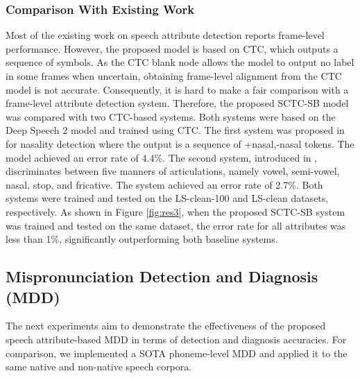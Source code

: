 \documentclass[12pt]{elsarticle}
\begin{document}
\subsubsection{Comparison With Existing Work} \label{sssec:Comp}

Most of the existing work on speech attribute detection reports frame-level performance. However, the proposed model is based on CTC, which outputs a sequence of symbols. As the CTC blank node allows the model to output no label in some frames when uncertain, obtaining frame-level alignment from the CTC model is not accurate. Consequently, it is hard to make a fair comparison with a frame-level attribute detection system.
Therefore, the proposed SCTC-SB model was compared with two CTC-based systems. Both systems were based on the Deep Speech 2 model \cite{RN137} and trained using CTC. The first system was proposed in \cite{RN162} for nasality detection where the output is a sequence of +nasal,-nasal tokens. The model achieved an error rate of 4.4\%. The second system, introduced in \cite{RN169}, discriminates between five manners of articulations, namely vowel, semi-vowel, nasal, stop, and fricative. The system achieved an error rate of 2.7\%. Both systems were trained and tested on the LS-clean-100 and LS-clean datasets, respectively. As shown in Figure \ref{fig:res3}, when the proposed SCTC-SB system was trained and tested on the same dataset, the error rate for all attributes was less than 1\%, significantly outperforming both baseline systems.

\subsection{Mispronunciation Detection and Diagnosis (MDD)}
The next experiments aim to demonstrate the effectiveness of the proposed speech attribute-based MDD in terms of detection and diagnosis accuracies. For comparison, we implemented a SOTA phoneme-level MDD and applied it to the same native and non-native speech corpora.
\end{document}

